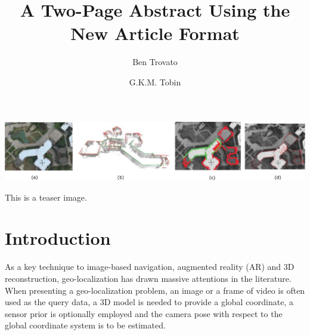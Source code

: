 \documentclass[sigconf,review,anonymous]{acmart}
\begin{document}
\title{A Two-Page Abstract Using the New Article Format}

\author{Ben Trovato}

\author{G.K.M. Tobin}

\renewcommand{\shortauthors}{B. Trovato et. al.}

\begin{teaserfigure}
  \includegraphics[width=\textwidth]{figures/teaser_pdf}
  \caption{This is a teaser image.}
  \label{fig:teaser}
\end{teaserfigure}


\maketitle

\section{Introduction}
%
As a key technique to image-based navigation, augmented reality (AR) and 3D reconstruction, geo-localization has drawn massive attentions in the literature. When presenting a geo-localization problem, an image or a frame of video is often used as the query data, a 3D model is needed to provide a global coordinate, a sensor prior is optionally employed and the camera pose with respect to the global coordinate system is to be estimated. 
\end{document}
